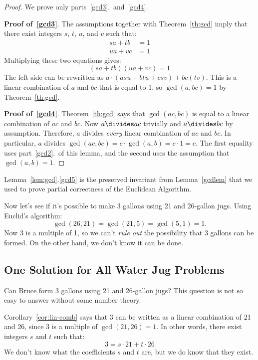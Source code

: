 \begin{proof}
We prove only parts~\ref{gcd3}.\ and~\ref{gcd4}.

\textbf{Proof of~\ref{gcd3}}.  The assumptions together with Theorem~\ref{th:gcd} imply
that there exist integers $s$, $t$, $u$, and $v$ such that:
%
\begin{align*}
s a + t b & = 1 \\
u a + v c & = 1
\end{align*}
%
Multiplying these two equations gives:
\[
(s a + t b)(u a + v c) = 1
\]
%
The left side can be rewritten as $a \cdot (a s u + b t u + c s v) + b c
(t v)$.  This is a linear combination of $a$ and $b c$ that is equal to 1,
so $\gcd(a, bc) = 1$ by Theorem~\ref{th:gcd}.

\textbf{Proof of~\ref{gcd4}}.  Theorem~\ref{th:gcd} says that $\gcd(ac, bc)$ is equal to a
linear combination of $ac$ and $bc$.  Now $a \divides ac$ trivially
and $a
\divides bc$ by assumption.  Therefore, $a$ divides \emph{every} linear
combination of $ac$ and $bc$.  In particular, $a$ divides $\gcd(ac, bc) =
c \cdot \gcd(a, b) = c\cdot 1 = c$.  The first equality uses part~\ref{gcd2}.\ of
this lemma, and the second uses the assumption that $\gcd(a, b) = 1$.
\end{proof}

Lemma~\ref{lem:gcd}.\ref{gcd5} is the preserved invariant from
Lemma~\ref{gcdlem} that we used to prove partial correctness of the
Euclidean Algorithm.

Now let's see if it's possible to make 3 gallons using 21 and 26-gallon
jugs.  Using Euclid's algorithm:
%
\[
\gcd(26, 21) = \gcd(21, 5) = \gcd(5, 1) = 1.
\]
%
Now 3 is a multiple of 1, so we can't \emph{rule out} the possibility
that 3 gallons can be formed.  On the other hand, we don't know it can be
done.

\subsection{One Solution for All Water Jug Problems}

Can Bruce form 3 gallons using 21 and 26-gallon jugs?  This question
is not so easy to answer without some number theory.

Corollary~\ref{cor:lin-comb} says that 3 can be written as a linear
combination of 21 and 26, since 3 is a multiple of $\gcd(21, 26) = 1$.
In other words, there exist integers $s$ and $t$ such that:
%
\[
3 = s \cdot 21 + t \cdot 26
\]
%
We don't know what the coefficients $s$ and $t$ are, but we do know
that they exist.

